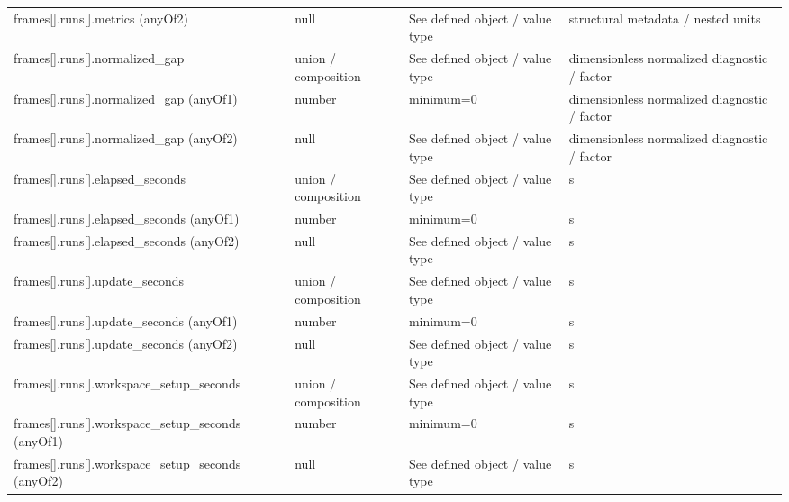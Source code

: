 \begin{longtable}{@{}>{\raggedright\arraybackslash}p{}>{\raggedright\arraybackslash}p{}>{\raggedright\arraybackslash}p{}>{\raggedright\arraybackslash}p{}@{}}
frames[].\allowbreak{}runs[].\allowbreak{}metrics (anyOf2) & null & See defined object /\allowbreak{} value type & structural metadata /\allowbreak{} nested units\\
frames[].\allowbreak{}runs[].\allowbreak{}normalized\_\allowbreak{}gap & union /\allowbreak{} composition & See defined object /\allowbreak{} value type & dimensionless normalized diagnostic /\allowbreak{} factor\\
frames[].\allowbreak{}runs[].\allowbreak{}normalized\_\allowbreak{}gap (anyOf1) & number & minimum=\allowbreak{}0 & dimensionless normalized diagnostic /\allowbreak{} factor\\
frames[].\allowbreak{}runs[].\allowbreak{}normalized\_\allowbreak{}gap (anyOf2) & null & See defined object /\allowbreak{} value type & dimensionless normalized diagnostic /\allowbreak{} factor\\
frames[].\allowbreak{}runs[].\allowbreak{}elapsed\_\allowbreak{}seconds & union /\allowbreak{} composition & See defined object /\allowbreak{} value type & s\\
frames[].\allowbreak{}runs[].\allowbreak{}elapsed\_\allowbreak{}seconds (anyOf1) & number & minimum=\allowbreak{}0 & s\\
frames[].\allowbreak{}runs[].\allowbreak{}elapsed\_\allowbreak{}seconds (anyOf2) & null & See defined object /\allowbreak{} value type & s\\
frames[].\allowbreak{}runs[].\allowbreak{}update\_\allowbreak{}seconds & union /\allowbreak{} composition & See defined object /\allowbreak{} value type & s\\
frames[].\allowbreak{}runs[].\allowbreak{}update\_\allowbreak{}seconds (anyOf1) & number & minimum=\allowbreak{}0 & s\\
frames[].\allowbreak{}runs[].\allowbreak{}update\_\allowbreak{}seconds (anyOf2) & null & See defined object /\allowbreak{} value type & s\\
frames[].\allowbreak{}runs[].\allowbreak{}workspace\_\allowbreak{}setup\_\allowbreak{}seconds & union /\allowbreak{} composition & See defined object /\allowbreak{} value type & s\\
frames[].\allowbreak{}runs[].\allowbreak{}workspace\_\allowbreak{}setup\_\allowbreak{}seconds (anyOf1) & number & minimum=\allowbreak{}0 & s\\
frames[].\allowbreak{}runs[].\allowbreak{}workspace\_\allowbreak{}setup\_\allowbreak{}seconds (anyOf2) & null & See defined object /\allowbreak{} value type & s\\

\end{longtable}
